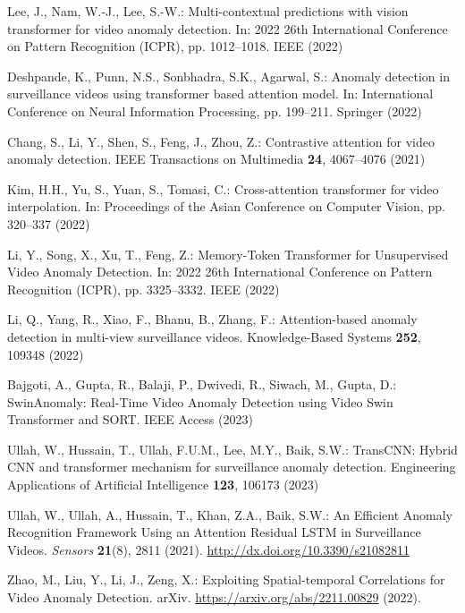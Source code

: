 \begin{thebibliography}{99}
Lee, J., Nam, W.-J., Lee, S.-W.: Multi-contextual predictions with vision transformer for video anomaly detection. In: 2022 26th International Conference on Pattern Recognition (ICPR), pp. 1012--1018. IEEE (2022)

Deshpande, K., Punn, N.S., Sonbhadra, S.K., Agarwal, S.: Anomaly detection in surveillance videos using transformer based attention model. In: International Conference on Neural Information Processing, pp. 199--211. Springer (2022)

Chang, S., Li, Y., Shen, S., Feng, J., Zhou, Z.: Contrastive attention for video anomaly detection. IEEE Transactions on Multimedia \textbf{24}, 4067--4076 (2021)

Kim, H.H., Yu, S., Yuan, S., Tomasi, C.: Cross-attention transformer for video interpolation. In: Proceedings of the Asian Conference on Computer Vision, pp. 320--337 (2022)

Li, Y., Song, X., Xu, T., Feng, Z.: Memory-Token Transformer for Unsupervised Video Anomaly Detection. In: 2022 26th International Conference on Pattern Recognition (ICPR), pp. 3325--3332. IEEE (2022)

Li, Q., Yang, R., Xiao, F., Bhanu, B., Zhang, F.: Attention-based anomaly detection in multi-view surveillance videos. Knowledge-Based Systems \textbf{252}, 109348 (2022)

Bajgoti, A., Gupta, R., Balaji, P., Dwivedi, R., Siwach, M., Gupta, D.: SwinAnomaly: Real-Time Video Anomaly Detection using Video Swin Transformer and SORT. IEEE Access (2023)

Ullah, W., Hussain, T., Ullah, F.U.M., Lee, M.Y., Baik, S.W.: TransCNN: Hybrid CNN and transformer mechanism for surveillance anomaly detection. Engineering Applications of Artificial Intelligence \textbf{123}, 106173 (2023)

Ullah, W., Ullah, A., Hussain, T., Khan, Z.A., Baik, S.W.: An Efficient Anomaly Recognition Framework Using an Attention Residual LSTM in Surveillance Videos. \textit{Sensors} \textbf{21}(8), 2811 (2021). \url{http://dx.doi.org/10.3390/s21082811}

Zhao, M., Liu, Y., Li, J., Zeng, X.: Exploiting Spatial-temporal Correlations for Video Anomaly Detection. arXiv. \url{https://arxiv.org/abs/2211.00829} (2022). 


\end{thebibliography}
